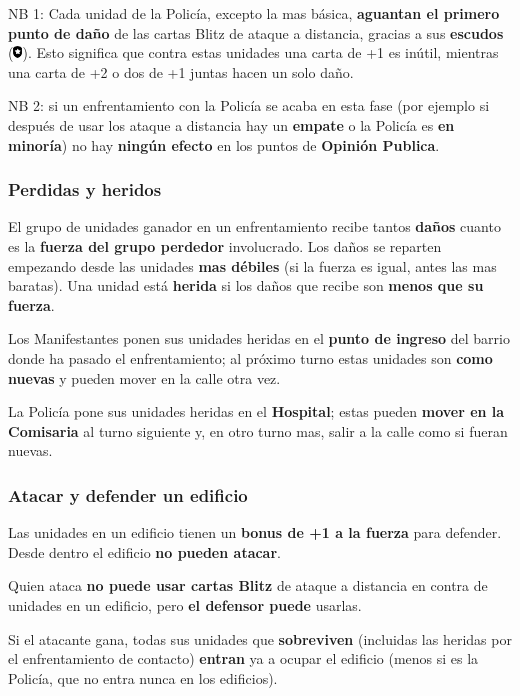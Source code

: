 \documentclass[a4paper,13pt]{scrartcl}
\begin{document}
NB 1: Cada unidad de la Polic\'ia, excepto la mas b\'asica, \textbf{aguantan el primero punto de da\~no} de las cartas Blitz de
ataque a distancia, gracias a sus \textbf{escudos} (\includegraphics[height=9pt]{shield.png}). Esto significa que contra estas unidades una carta de +1 es in\'util,
mientras una carta de +2 o dos de +1 juntas hacen un solo da\~no.

NB 2: si un enfrentamiento con la Polic\'ia se acaba en esta fase (por ejemplo si despu\'es de usar los ataque a
distancia hay un \textbf{empate} o la Polic\'ia es \textbf{en minor\'ia}) no hay \textbf{ning\'un efecto} en los puntos de \textbf{Opini\'on Publica}.

\subsubsection*{Perdidas y heridos}
El grupo de unidades ganador en un enfrentamiento recibe tantos \textbf{da\~nos} cuanto es la \textbf{fuerza del grupo perdedor}
involucrado. Los da\~nos se reparten empezando desde las unidades \textbf{mas d\'ebiles} (si la fuerza es igual, antes las mas
baratas). Una unidad est\'a \textbf{herida} si los da\~nos que recibe son \textbf{menos que su fuerza}.

Los Manifestantes ponen sus unidades heridas en el \textbf{punto de ingreso} del barrio donde ha pasado el enfrentamiento; al
pr\'oximo turno estas unidades son \textbf{como nuevas} y pueden mover en la calle otra vez.

La Polic\'ia pone sus unidades heridas en el \textbf{Hospital}; estas pueden \textbf{mover en la Comisaria} al turno siguiente y, en otro
turno mas, salir a la calle como si fueran nuevas.

\subsubsection*{Atacar y defender un edificio}
Las unidades en un edificio tienen un \textbf{bonus de +1 a la fuerza} para defender. Desde dentro el edificio \textbf{no pueden atacar}.

Quien ataca \textbf{no puede usar cartas Blitz} de ataque a distancia en contra de unidades en un edificio, pero \textbf{el defensor
puede} usarlas.

Si el atacante gana, todas sus unidades que \textbf{sobreviven} (incluidas las heridas por el enfrentamiento de contacto) \textbf{entran}
ya a ocupar el edificio (menos si es la Polic\'ia, que no entra nunca en los edificios).
\end{document}
